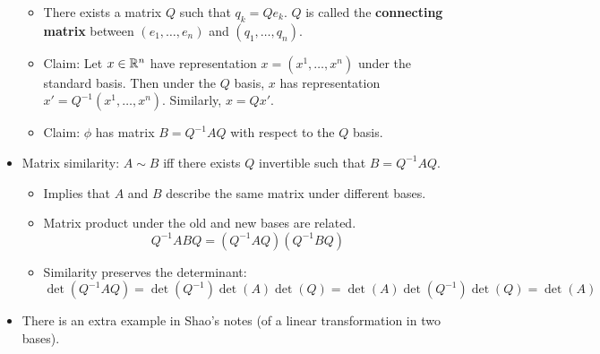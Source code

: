 \documentclass[../notes.tex]{subfiles}
\begin{document}
\begin{itemize}
    \begin{itemize}
        \item There exists a matrix $Q$ such that $q_k=Qe_k$. $Q$ is called the \textbf{connecting matrix} between $(e_1,\dots,e_n)$ and $(q_1,\dots,q_n)$.
        \item Claim: Let $x\in\mathbb{R}^n$ have representation $x=(x^1,\dots,x^n)$ under the standard basis. Then under the $Q$ basis, $x$ has representation $x'=Q^{-1}(x^1,\dots,x^n)$. Similarly, $x=Qx'$.
        \item Claim: $\phi$ has matrix $B=Q^{-1}AQ$ with respect to the $Q$ basis.
    \end{itemize}
    \item Matrix similarity: $A\sim B$ iff there exists $Q$ invertible such that $B=Q^{-1}AQ$.
    \begin{itemize}
        \item Implies that $A$ and $B$ describe the same matrix under different bases.
        \item Matrix product under the old and new bases are related.
        \begin{equation*}
            Q^{-1}ABQ = (Q^{-1}AQ)(Q^{-1}BQ)
        \end{equation*}
        \item Similarity preserves the determinant:
        \begin{equation*}
            \det(Q^{-1}AQ) = \det(Q^{-1})\det(A)\det(Q)
            = \det(A)\det(Q^{-1})\det(Q)
            = \det(A)
        \end{equation*}
    \end{itemize}
    \item There is an extra example in Shao's notes (of a linear transformation in two bases).
\end{itemize}
\end{document}
